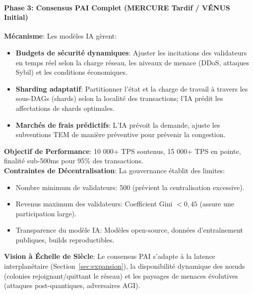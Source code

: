 \documentclass[11pt]{article}
\begin{document}
\paragraph{Phase 3: Consensus PAI Complet (MERCURE Tardif / VÉNUS Initial)}
\textbf{Mécanisme}: Les modèles IA gèrent:
\begin{itemize}[noitemsep]
  \item \textbf{Budgets de sécurité dynamiques}: Ajuster les incitations des validateurs en temps réel selon la charge réseau, les niveaux de menace (DDoS, attaques Sybil) et les conditions économiques.
  \item \textbf{Sharding adaptatif}: Partitionner l'état et la charge de travail à travers les sous-DAGs (shards) selon la localité des transactions; l'IA prédit les affectations de shards optimales.
  \item \textbf{Marchés de frais prédictifs}: L'IA prévoit la demande, ajuste les subventions TEM de manière préventive pour prévenir la congestion.
\end{itemize}
\textbf{Objectif de Performance}: 10 000+ TPS soutenus, 15 000+ TPS en pointe, finalité sub-500ms pour 95\% des transactions.\\
\textbf{Contraintes de Décentralisation}: La gouvernance établit des limites:
\begin{itemize}[noitemsep]
  \item Nombre minimum de validateurs: 500 (prévient la centralisation excessive).
  \item Revenus maximum des validateurs: Coefficient Gini $<0,45$ (assure une participation large).
  \item Transparence du modèle IA: Modèles open-source, données d'entraînement publiques, builds reproductibles.
\end{itemize}
\textbf{Vision à Échelle de Siècle}: Le consensus PAI s'adapte à la latence interplanétaire (Section~\ref{sec:expansion}), la disponibilité dynamique des nœuds (colonies rejoignant/quittant le réseau) et les paysages de menaces évolutives (attaques post-quantiques, adversaires AGI).
\end{document}
